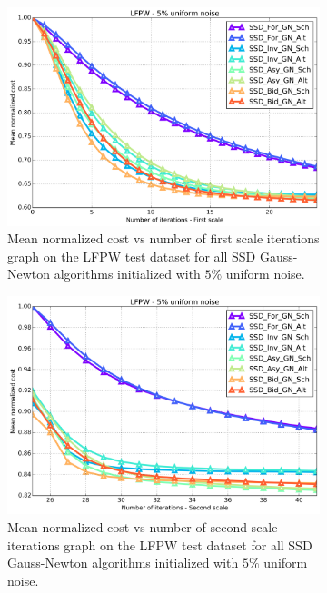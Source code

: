 \begin{figure}[h!]
\begin{subfigure}{0.48\textwidth}
	\end{subfigure}
	\par\medskip
	\begin{subfigure}{0.48\textwidth}
	    \includegraphics[width=\textwidth]{experiments/algorithms/ssd_gn/mean_cost_vs_iters1_ssd_gn_5.png}
	    \caption{Mean normalized cost vs number of first scale iterations graph on the LFPW test dataset for all SSD Gauss-Newton algorithms initialized with $5\%$ uniform noise.}
	    \label{fig:mean_cost_vs_iters1_ssd_gn_5}
	\end{subfigure}
	\hfill
	\begin{subfigure}{0.48\textwidth}
	    \includegraphics[width=\textwidth]{experiments/algorithms/ssd_gn/mean_cost_vs_iters2_ssd_gn_5.png}
	    \caption{Mean normalized cost vs number of second scale iterations graph on the LFPW test dataset for all SSD Gauss-Newton algorithms initialized with $5\%$ uniform noise.}
	    \label{fig:mean_cost_vs_iters2_ssd_gn_5}
	\end{subfigure}
	\label{fig:ssd_gn_5}
	\caption{}
\end{figure}



